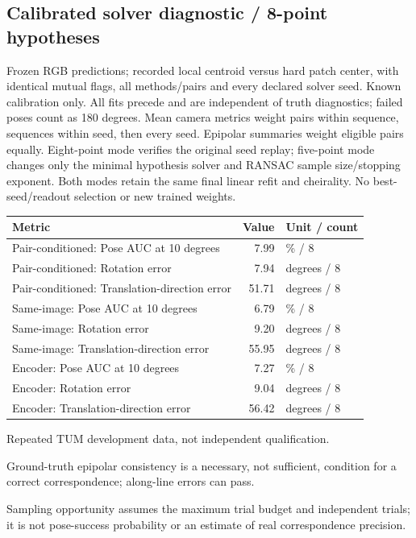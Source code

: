 \documentclass[10pt]{article}
\begin{document}
\subsection{Calibrated solver diagnostic / 8-point hypotheses}
Frozen RGB predictions; recorded local centroid versus hard patch center, with identical mutual flags, all methods/pairs and every declared solver seed. Known calibration only. All fits precede and are independent of truth diagnostics; failed poses count as 180 degrees. Mean camera metrics weight pairs within sequence, sequences within seed, then every seed. Epipolar summaries weight eligible pairs equally. Eight-point mode verifies the original seed replay; five-point mode changes only the minimal hypothesis solver and RANSAC sample size/stopping exponent. Both modes retain the same final linear refit and cheirality. No best-seed/readout selection or new trained weights.
\begin{center}\begin{tabular}{p{.57\linewidth}rp{.23\linewidth}}\toprule Metric & Value & Unit / count \\ \midrule
Pair-conditioned: Pose AUC at 10 degrees & 7.99 & \% / 8 \\
Pair-conditioned: Rotation error & 7.94 & degrees / 8 \\
Pair-conditioned: Translation-direction error & 51.71 & degrees / 8 \\
Same-image: Pose AUC at 10 degrees & 6.79 & \% / 8 \\
Same-image: Rotation error & 9.20 & degrees / 8 \\
Same-image: Translation-direction error & 55.95 & degrees / 8 \\
Encoder: Pose AUC at 10 degrees & 7.27 & \% / 8 \\
Encoder: Rotation error & 9.04 & degrees / 8 \\
Encoder: Translation-direction error & 56.42 & degrees / 8 \\
\bottomrule\end{tabular}\end{center}
Repeated TUM development data, not independent qualification.

Ground-truth epipolar consistency is a necessary, not sufficient, condition for a correct correspondence; along-line errors can pass.

Sampling opportunity assumes the maximum trial budget and independent trials; it is not pose-success probability or an estimate of real correspondence precision.
\end{document}
